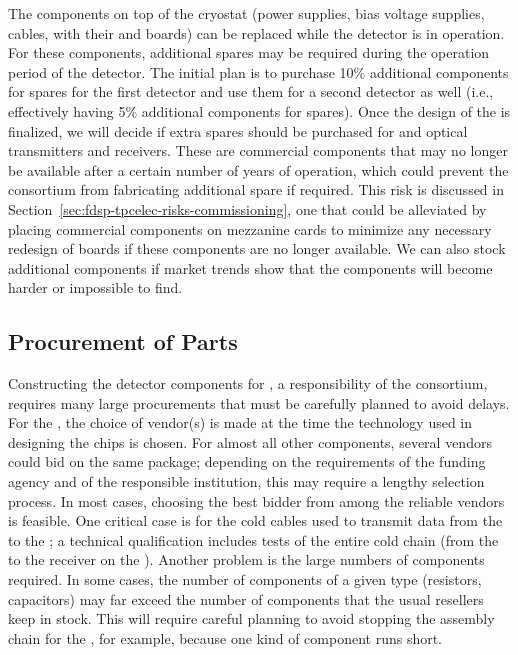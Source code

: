 The components on top of the cryostat (power supplies, bias
voltage supplies, cables,  with their 
and  boards) can be replaced while the
detector is in operation. For these components, additional spares may be required
during the \dunelifetime operation period of the  detector.
The initial plan is to purchase 10\% additional components for spares for the first
 detector and use them for a second detector as well
(i.e., effectively having 5\% additional components for spares). Once the design of
the  is finalized, we will decide if 
extra spares should be purchased for  and optical
transmitters and receivers. These are commercial components 
that may no longer be available after a certain number of 
years of operation, which could prevent the  consortium from
fabricating additional spare  if required. This
risk is discussed in Section~\ref{sec:fdsp-tpcelec-risks-commissioning}, one that
could be alleviated by placing commercial components
on mezzanine cards to minimize any necessary redesign of
boards if these components are no longer available.
We can also stock additional components
if market trends show that the components will  
become harder or impossible to find.

\subsection{Procurement of Parts}
\label{sec:fdsp-tpcelec-production-procurement}

Constructing the detector components for , a
responsibility of the  consortium, requires many
large procurements that must be carefully planned to avoid
delays. For the , the choice of vendor(s)
is made at the time the technology
used in designing the chips is chosen. For almost all other components,
several vendors could bid on the same 
package; depending on the requirements of the funding
agency and of the responsible institution, this may require a lengthy
selection process. In most cases, choosing
the best bidder from among the reliable vendors is feasible. One critical case
is for the cold cables used to transmit data from the
 to the ; a technical qualification
includes tests of the entire cold chain (from the 
to the receiver on the ). Another 
problem is the large numbers of components
required. In some cases, the number of components of a given
type (resistors, capacitors) may far exceed the number of components
that the usual resellers keep in stock. This will 
require careful planning to avoid stopping the assembly chain for
the , for example, because 
one kind of component runs short.

